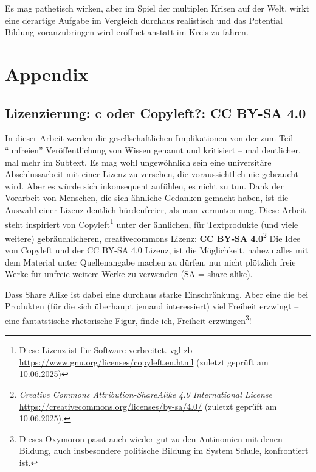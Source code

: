 
Es mag pathetisch wirken, aber im Spiel der multiplen Krisen auf der Welt, wirkt eine derartige Aufgabe im Vergleich durchaus realistisch und das Potential Bildung voranzubringen wird eröffnet anstatt im Kreis zu fahren. 





\clearpage
\newpage
\printbibliography[title=Literaturverzeichnis, heading=bibintoc, nottype=unused] 

\appendix %

\section{Appendix}
\subsection{Lizenzierung: \acrfull{c} oder Copyleft?: CC BY-SA 4.0 \label{lizenz}}
In dieser Arbeit werden die gesellschaftlichen Implikationen von der zum Teil \enquote{unfreien}  Veröffentlichung von Wissen genannt und kritisiert -- mal deutlicher, mal mehr im Subtext.
Es mag wohl ungewöhnlich sein eine universitäre Abschlussarbeit mit einer Lizenz zu versehen, die voraussichtlich nie gebraucht wird. Aber es würde sich inkonsequent anfühlen, es nicht zu tun.
Dank der Vorarbeit von Menschen, die sich ähnliche Gedanken gemacht haben, ist die Auswahl einer Lizenz deutlich hürdenfreier, als man vermuten mag. Diese Arbeit steht inspiriert von Copyleft\footnote{Diese Lizenz ist für Software verbreitet. \gls{vgl} \gls{zb} \url{https://www.gnu.org/licenses/copyleft.en.html} (zuletzt geprüft am 10.06.2025)} unter der ähnlichen, für Textprodukte (und viele weitere) gebräuchlicheren, creativecommons Lizenz: \textbf{CC BY-SA 4.0}\footnote{\emph{Creative Commons Attribution-ShareAlike 4.0 International License} \url{https://creativecommons.org/licenses/by-sa/4.0/} (zuletzt geprüft am 10.06.2025).} Die Idee von Copyleft und der CC BY-SA 4.0 Lizenz, ist die Möglichkeit, nahezu alles mit dem Material unter Quellenangabe machen zu dürfen, nur nicht plötzlich freie Werke für unfreie weitere Werke zu verwenden (SA = share alike). 

Dass Share Alike ist dabei eine durchaus starke Einschränkung. Aber eine die bei Produkten (für die sich überhaupt jemand interessiert) viel Freiheit erzwingt -- eine fantatstische rhetorische Figur, finde ich, Freiheit erzwingen\footnote{Dieses Oxymoron passt auch wieder gut zu den Antinomien mit denen Bildung, auch insbesondere politische Bildung im System Schule, konfrontiert ist.}!

